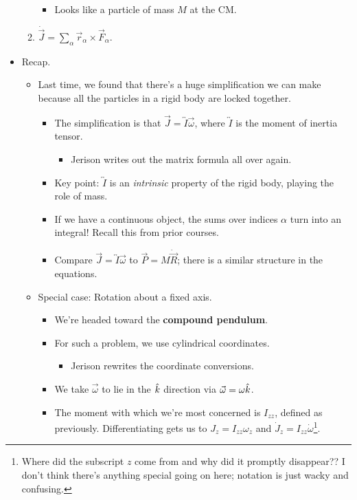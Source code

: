 \documentclass[../notes.tex]{subfiles}
\begin{document}
\begin{itemize}
\begin{enumerate}
\begin{itemize}
            \item Looks like a particle of mass $M$ at the CM.
        \end{itemize}
        \item $\dot{\vec{J}}=\sum_\alpha\vec{r}_\alpha\times\vec{F}_\alpha$.
    \end{enumerate}
    \item Recap.
    \begin{itemize}
        \item Last time, we found that there's a huge simplification we can make because all the particles in a rigid body are locked together.
        \begin{itemize}
            \item The simplification is that $\vec{J}=\overleftrightarrow{I}\vec{\omega}$, where $\overleftrightarrow{I}$ is the moment of inertia tensor.
            \begin{itemize}
                \item Jerison writes out the matrix formula all over again.
            \end{itemize}
            \item Key point: $\overleftrightarrow{I}$ is an \emph{intrinsic} property of the rigid body, playing the role of mass.
            \item If we have a continuous object, the sums over indices $\alpha$ turn into an integral! Recall this from prior courses.
            \item Compare $\vec{J}=\overleftrightarrow{I}\vec{\omega}$ to $\vec{P}=M\dot{\vec{R}}$; there is a similar structure in the equations.
        \end{itemize}
        \item Special case: Rotation about a fixed axis.
        \begin{itemize}
            \item We're headed toward the \textbf{compound pendulum}.
            \item For such a problem, we use cylindrical coordinates.
            \begin{itemize}
                \item Jerison rewrites the coordinate conversions.
            \end{itemize}
            \item We take $\vec{\omega}$ to lie in the $\hat{k}$ direction via $\vec{\omega}=\omega\hat{k}$.
            \item The moment with which we're most concerned is $I_{zz}$, defined as previously. Differentiating gets us to $J_z=I_{zz}\omega_z$ and $\dot{J}_z=I_{zz}\dot{\omega}$\footnote{Where did the subscript $z$ come from and why did it promptly disappear?? I don't think there's anything special going on here; notation is just wacky and confusing.}.

\end{itemize}
\end{itemize}
\end{itemize}
\end{document}
